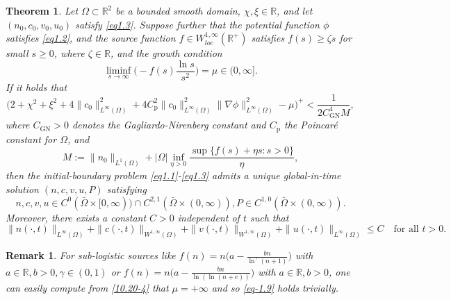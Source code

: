 \documentclass[10pt,a4paper]{amsart}
\numberwithin{equation}{section}
\newtheorem{theorem}[theo]{Theorem}
\newtheorem{remark}[theo]{Remark}
\begin{document}
\begin{theorem}\label{Th1.1}
Let $\Omega \subset \mathbb{R}^2$ be a bounded smooth domain, 
$\chi, \xi \in \mathbb{R}$, and let $(n_0, c_0, v_0, u_0)$ satisfy \eqref{eq1.3}. 
Suppose further that the potential function $\phi$ satisfies \eqref{eq1.2}, and
the source function $f\in W_{loc}^{1, \infty}(\mathbb{R}^+)$ satisfies 
$f(s)\geq \zeta s$ for small $s\geq0$, where $\zeta\in \mathbb{R}$, and the growth 
condition
\begin{equation}\label{10.20-4}
\liminf_{s \to \infty} \Big( - f(s) \frac{\ln s}{s^2} \Big) = \mu \in (0, \infty].
\end{equation}
If it holds that
\begin{equation}\label{eq-1.9}
\Big(2 + \chi^2 + \xi^2 + 4\|c_0\|_{L^\infty(\Omega)}^2
+ 4 C_{\mathrm{p}}^2\|c_0\|_{L^\infty(\Omega)}^2 \|\nabla \phi\|_{L^\infty(\Omega)}^2 
-\mu\Big)^+ < \frac{1}{2 C_{\mathrm{GN}}^4 M},
\end{equation}
where $C_{\mathrm{GN}} > 0$ denotes the Gagliardo-Nirenberg constant and 
$C_{\mathrm{p}}$ the Poincar\'e constant for $\Omega$, and 
\begin{equation}\label{eq-1.10}
M :=\|n_0\|_{L^1(\Omega)}+|\Omega| \inf_{\eta>0} 
\frac{\sup \{ f(s) + \eta s : s > 0 \}}{\eta},
\end{equation}
then the initial-boundary problem \eqref{eq1.1}-\eqref{eq1.3} admits a unique 
global-in-time solution $(n, c, v, u, P)$ satisfying
\begin{equation}\label{eq-1.11}
n, c, v, u \in C^0(\bar{\Omega} \times [0, \infty)) \cap C^{2, 1}(\bar{\Omega} \times (0, \infty)), P \in C^{1, 0}(\bar{\Omega} \times (0, \infty)).
\end{equation}
Moreover, there exists a constant $C > 0$ independent of $t$ such that
\begin{equation}\label{eq-1.12}
\| n(\cdot, t) \|_{L^\infty(\Omega)} + \| c(\cdot, t) \|_{W^{1,\infty}(\Omega)} 
+ \|v(\cdot, t)\|_{W^{1,\infty}(\Omega)} + \| u(\cdot, t)
\|_{L^\infty(\Omega)} \leq C  \quad \text{for all } t > 0.
\end{equation}
\end{theorem}

\begin{remark}\label{rem1.1} \rm
For sub-logistic sources like \( f(n) = n \bigl( a- \frac{bn}{\ln^\gamma(n+1)}\bigr)\) 
with \( a \in \mathbb{R}, b > 0, \gamma \in (0,1) \) or 
\( f(n) = n\bigl(a-\frac{bn}{\ln(\ln(n+e))}\bigr)\) with \( a \in \mathbb{R}, b>0\), 
one can easily compute from \eqref{10.20-4} that \( \mu= +\infty \) and so 
\eqref{eq-1.9} holds trivially.
\end{remark}
\end{document}
